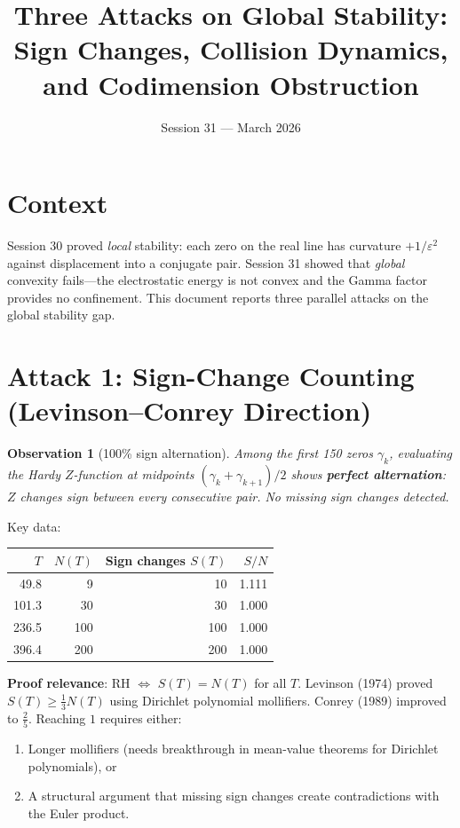 \documentclass[11pt]{article}
\title{Three Attacks on Global Stability:\\Sign Changes, Collision Dynamics, and Codimension Obstruction}
\author{Session 31 --- March 2026}
\date{}
\newtheorem{observation}{Observation}
\begin{document}
\maketitle

\section{Context}

Session 30 proved \emph{local} stability: each zero on the real line has curvature $+1/\varepsilon^2$ against displacement into a conjugate pair.  Session 31 showed that \emph{global} convexity fails---the electrostatic energy is not convex and the Gamma factor provides no confinement.  This document reports three parallel attacks on the global stability gap.

\section{Attack 1: Sign-Change Counting (Levinson--Conrey Direction)}

\begin{observation}[100\% sign alternation]
Among the first 150 zeros $\gamma_k$, evaluating the Hardy $Z$-function at midpoints $({\gamma_k + \gamma_{k+1}})/{2}$ shows \textbf{perfect alternation}: $Z$ changes sign between every consecutive pair. No missing sign changes detected.
\end{observation}

\noindent Key data:
\begin{center}
\begin{tabular}{rrrr}
\toprule
$T$ & $N(T)$ & Sign changes $S(T)$ & $S/N$ \\
\midrule
49.8 & 9 & 10 & 1.111 \\
101.3 & 30 & 30 & 1.000 \\
236.5 & 100 & 100 & 1.000 \\
396.4 & 200 & 200 & 1.000 \\
\bottomrule
\end{tabular}
\end{center}

\noindent\textbf{Proof relevance}: RH $\Leftrightarrow$ $S(T) = N(T)$ for all $T$.  Levinson (1974) proved $S(T) \geq \frac{1}{3}N(T)$ using Dirichlet polynomial mollifiers.  Conrey (1989) improved to $\frac{2}{5}$.  Reaching $1$ requires either:
\begin{enumerate}
\item Longer mollifiers (needs breakthrough in mean-value theorems for Dirichlet polynomials), or
\item A structural argument that missing sign changes create contradictions with the Euler product.
\end{enumerate}
\end{document}
